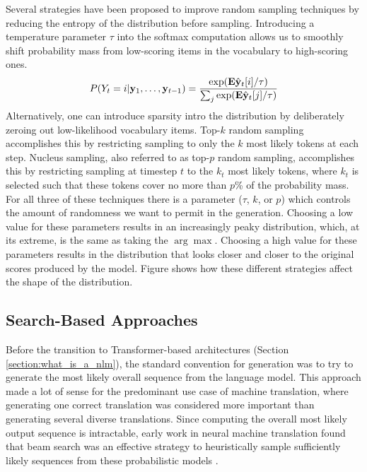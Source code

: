 Several strategies have been proposed to improve random sampling techniques by reducing the entropy of the distribution before sampling.
Introducing a temperature parameter $\tau$ into the softmax computation allows us to smoothly shift probability mass from low-scoring items in the vocabulary to high-scoring ones.
\begin{align}
    \label{equation:softmax_with_temp}
    P(Y_t=i | \mathbf{y}_1, \ldots, \mathbf{y}_{t-1}) = \frac{\exp(\mathbf{E}\hat{\mathbf{y}}_t[i]/\tau)}{\sum_j\exp(\mathbf{E}\hat{\mathbf{y}}_t[j]/\tau)}
\end{align}
Alternatively, one can introduce sparsity intro the distribution by deliberately zeroing out low-likelihood vocabulary items.
Top-$k$ random sampling accomplishes this by restricting sampling to only the $k$ most likely tokens at each step.
Nucleus sampling, also referred to as top-$p$ random sampling, accomplishes this by restricting sampling at timestep $t$ to the $k_t$ most likely tokens, where $k_t$ is selected such that these tokens cover no more than $p$\% of the probability mass.
For all three of these techniques there is a parameter ($\tau$, $k$, or $p$) which controls the amount of randomness we want to permit in the generation.
Choosing a low value for these parameters results in an increasingly peaky distribution, which, at its extreme, is the same as taking the $\arg \max$. 
Choosing a high value for these parameters results in the distribution that looks closer and closer to the original scores produced by the model.
Figure  shows how these different strategies affect the shape of the distribution.

\subsection{Search-Based Approaches}
Before the transition to Transformer-based architectures (Section \ref{section:what_is_a_nlm}), the standard convention for generation was to try to generate the most likely overall sequence from the language model.
This approach made a lot of sense for the predominant use case of machine translation, where generating one correct translation was considered more important than generating several diverse translations.
Since computing the overall most likely output sequence is intractable, early work in neural machine translation found that beam search was an effective strategy to heuristically sample sufficiently likely sequences from these probabilistic models \cite{sutskever2014sequence}.

